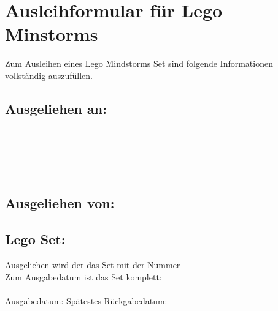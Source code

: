 \documentclass[parskip=half]{scrartcl}
\begin{document}
\section*{Ausleihformular für Lego Minstorms}

Zum Ausleihen eines Lego Mindstorms Set sind folgende Informationen vollständig auszufüllen.
\begin{Form}
\subsection*{Ausgeliehen an:}
\renewcommand{\LayoutTextField}[2]{%
  #2\\\vspace{-4pt}{\scriptsize#1}%
}
\\
\\
\\
\\

\subsection*{Ausgeliehen von:}

\subsection*{Lego Set:}
Ausgeliehen wird der das Set mit der Nummer \TextField[name=setnum, width=1cm,borderstyle=U]{}\\
Zum Ausgabedatum ist das Set komplett: \CheckBox[name=ausgabe]{}
\\
\\
\renewcommand{\LayoutTextField}[2]{#2}
Ausgabedatum: \hspace{1cm} Spätestes Rückgabedatum: \\
\\
\renewcommand{\LayoutTextField}[2]{%
  #2\\\vspace{-4pt}{\scriptsize#1}%
}
\\
\\
\noindent\makebox[\linewidth]{\rule{\paperwidth}{0.4pt}}
\\
\renewcommand{\LayoutTextField}[2]{#2}

\end{Form}
\end{document}
